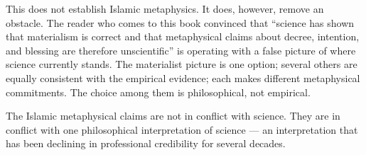 This does not establish Islamic metaphysics. It does, however,
remove an obstacle. The reader who comes to this book convinced
that ``science has shown that materialism is correct and that
metaphysical claims about decree, intention, and blessing are
therefore unscientific'' is operating with a false picture of where
science currently stands. The materialist picture is one option;
several others are equally consistent with the empirical evidence;
each makes different metaphysical commitments. The choice among
them is philosophical, not empirical.

The Islamic metaphysical claims are not in conflict with science.
They are in conflict with one philosophical interpretation of
science --- an interpretation that has been declining in
professional credibility for several decades.

